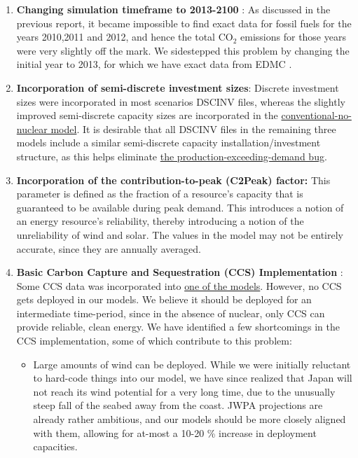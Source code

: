 \documentclass[14pt,a4paper]{article} %
\begin{document}
\begin{enumerate}
\item \textbf{Changing simulation timeframe to 2013-2100} : As discussed in the previous report, it became impossible to find exact data for fossil fuels for the years 2010,2011 and 2012, and hence the total CO$_2$ emissions for those years were very slightly off the mark. We sidestepped this problem by changing the initial year to 2013, for which we have exact data from EDMC \cite{noauthor_energy_2018}.

\item \textbf{Incorporation of semi-discrete investment sizes}: Discrete investment sizes were incorporated in most scenarios DSCINV files, whereas the slightly improved semi-discrete capacity sizes are incorporated in the \href{https://github.com/arfc/i2cner/tree/master/JPN-Main-Model/active/co2-constrnt-conv-nonuc}{conventional-no-nuclear model}. It is desirable that all DSCINV files in the remaining three models include a similar semi-discrete capacity installation/investment structure, as this helps eliminate \href{https://github.com/arfc/i2cner/issues/74}{the production-exceeding-demand bug}. \\

\item \textbf{Incorporation of the contribution-to-peak (C2Peak) \citep{gargiulo_documentation_2005} factor:} This parameter is defined as the fraction of a resource's capacity that is guaranteed to be available during peak demand. This introduces a notion of an energy resource's reliability, thereby introducing a notion of the unreliability of wind and solar. The values in the model \cite{kato_energy_2016} may not be entirely accurate, since they are annually averaged.\\

\item \textbf{Basic Carbon Capture and Sequestration (CCS) Implementation} : Some CCS data \cite{kato_energy_2016}  was incorporated into \href{https://github.com/arfc/i2cner/tree/master/JPN-Main-Model/active/i2cner-nonuc}{one of the models}. However, no CCS gets deployed in our models. We believe  it should be deployed for an intermediate time-period, since in the absence of nuclear, only CCS can provide reliable, clean energy. We have identified a few shortcomings in the CCS implementation, some of which contribute to this problem:
\begin{itemize}

\item Large amounts of wind can be deployed. While we were initially reluctant to hard-code things into our model, we have since realized that Japan will not reach its wind potential for a very long time, due to the unusually steep fall of the seabed away from the coast. JWPA projections \cite{heger_wind_2016} are already rather ambitious, and our models should be more closely aligned with them, allowing for at-most a 10-20 \% increase in deployment capacities.


\end{itemize}
\end{enumerate}
\end{document}
